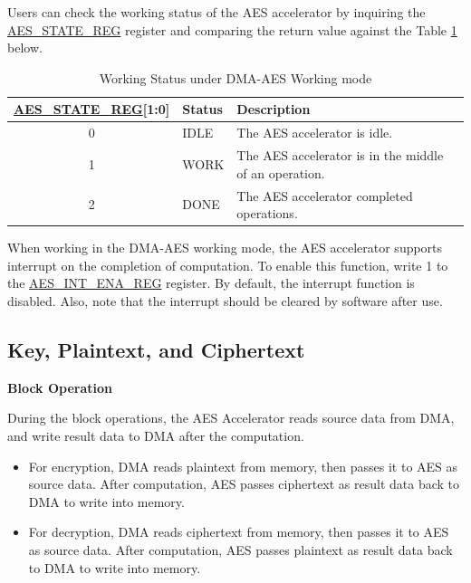 \documentclass[main\_\_EN.tex]{subfiles}
\begin{document}
Users can check the working status of the AES accelerator by inquiring the \hyperref[regdesc:AESSTATEREG]{AES\_STATE\_REG} register and comparing the return value against the Table \ref{tab:aes-state-value-dma} below.

\clearpage
\begin{longtable}[c]{ | c | l | l | }
\caption{Working Status under DMA-AES Working mode}
\label{tab:aes-state-value-dma}
\\\hline
\rowcolor{lightgray}
\hyperref[regdesc:AESSTATEREG]{AES\_STATE\_REG}[1:0] & Status &  Description \\ \hline

    0                   & IDLE      &   The AES accelerator is idle.\\ \hline
    1                   & WORK      &   The AES accelerator is in the middle of an operation.     \\ \hline
    2                   & DONE      &   The AES accelerator completed operations.     \\ \hline
\end{longtable}

When working in the DMA-AES working mode, the AES accelerator supports interrupt on the completion of computation. To enable this function, write 1 to the \hyperref[regdesc:AESINTENAREG]{AES\_INT\_ENA\_REG} register. By default, the interrupt function is disabled. Also, note that the interrupt should be cleared by software after use.


\subsection{Key, Plaintext, and Ciphertext}

\textbf{Block Operation}

During the block operations, the AES Accelerator reads source data from DMA, and write result data to DMA after the computation.

\begin{itemize}
    \item For encryption, DMA reads plaintext from memory, then passes it to AES as source data. After computation, AES passes ciphertext as result data  back to DMA to write into memory.
    \item For decryption, DMA reads ciphertext from memory, then passes it to AES as source data. After computation, AES passes plaintext as result data back to DMA to write into memory.
\end{itemize}
\end{document}
